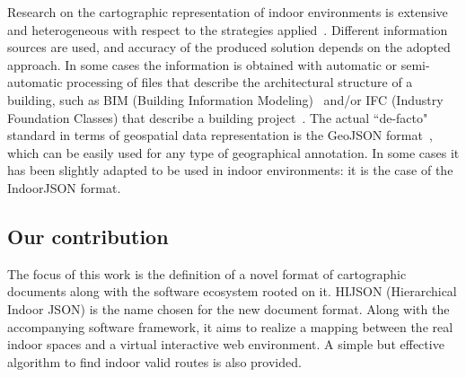 \documentclass[]{egpubl}
\begin{document}
Research on the cartographic representation of indoor environments is
extensive and heterogeneous with respect to the strategies
applied~\cite{6418876}. Different information sources are used, and accuracy
of the produced solution depends on the adopted approach. In some cases the
information is obtained with automatic or semi-automatic processing of files
that describe the architectural structure of a building, such as BIM (Building
Information Modeling)~\cite{Eastman:2008:BHG:1796500} and/or IFC (Industry
Foundation Classes) that describe a building project~\cite{6816739}.  The actual ``de-facto" 
standard in terms of geospatial data representation is the GeoJSON
format~\cite{geojson:2008}, which can be easily used for any type of geographical annotation. In
some cases it has been slightly adapted to be used in indoor environments: it
is the case of the IndoorJSON format.



\subsection{Our contribution}

The focus of this work is the definition of a novel format of cartographic
documents along with the software ecosystem rooted on it. HIJSON (Hierarchical
Indoor JSON) is the name chosen for the new document format. Along with the
accompanying software framework, it aims to realize a mapping between the real
indoor spaces and a virtual interactive web environment. A simple but
effective algorithm to find indoor valid routes is also provided.


\end{document}
